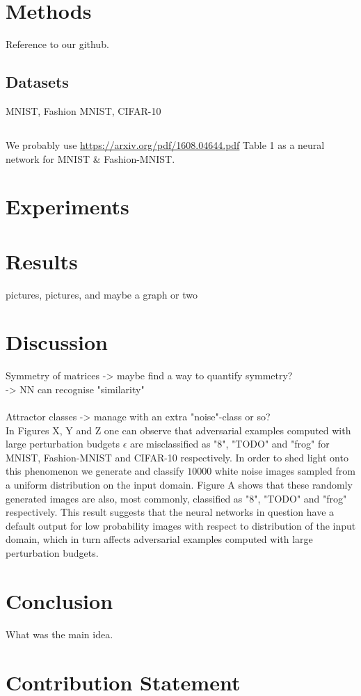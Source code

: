 \documentclass{article}
\begin{document}
\section{Methods}

Reference to our github.

\subsection{Datasets}
MNIST, Fashion MNIST, CIFAR-10

\subsection{}
We probably use \url{https://arxiv.org/pdf/1608.04644.pdf} Table 1 as a neural network for MNIST \& Fashion-MNIST.

\section{Experiments}


\section{Results}
pictures, pictures, and maybe a graph or two


\section{Discussion}

Symmetry of matrices -> maybe find a way to quantify symmetry?\\
-> NN can recognise "similarity"\\
\\

Attractor classes -> manage with an extra "noise"-class or so?\\


In Figures X, Y and Z one can observe that adversarial examples computed with large perturbation budgets $\epsilon$ are misclassified as "8", "TODO" and "frog" for MNIST, Fashion-MNIST and CIFAR-10 respectively. In order to shed light onto this phenomenon we generate and classify $10000$ white noise images sampled from a uniform distribution on the input domain. Figure A shows that these randomly generated images are also, most commonly, classified as "8", "TODO" and "frog" respectively. This result suggests that the neural networks in question have a default output for low probability images with respect to distribution of the input domain, which in turn affects adversarial examples computed with large perturbation budgets.

\section{Conclusion}
What was the main idea.

\section{Contribution Statement}



\end{document}
